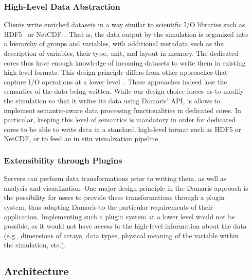 \subsubsection{High-Level Data Abstraction}

Clients write enriched datasets in a way similar to scientific I/O libraries such as HDF5~\cite{folk1999hdf5} or NetCDF~\cite{netcdf}.
That is, the data output by the simulation is organized into a hierarchy of groups and variables,
with additional metadata such as the description of variables, their type, unit, and layout in memory.
The dedicated cores thus have enough knowledge of incoming datasets to write them in existing high-level 
formats. This design principle differs from other approaches that capture I/O operations at a lower 
level~\cite{li2010functional,ma2006highlevel}. These approaches indeed lose the semantics of the data being written.
While our design choice forces us to modify the simulation so that it writes its data using Damaris' API,
is allows to implement semantic-aware data processing functionalities in dedicated cores. In particular, keeping
this level of semantics is mandatory in order for dedicated cores to be able to write data in a standard, high-level
format such as HDF5 or NetCDF, or to feed an in situ visualization pipeline.

\subsubsection{Extensibility through Plugins}

Servers can perform data transformations prior to writing them, as well as analysis and visualization.
One major design principle in the Damaris approach is the possibility for users to provide these 
transformations through a plugin system, thus adapting Damaris to the particular requirements of 
their application. Implementing such a plugin system at a lower level would
not be possible, as it would not have access to the high-level information about
the data (e.g., dimensions of arrays, data types, physical meaning of the variable 
within the simulation, etc.).

\subsection{Architecture}

